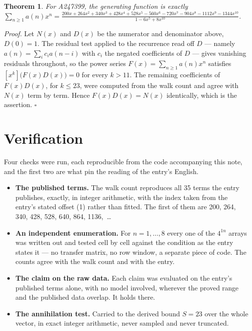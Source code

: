 \documentclass[11pt]{article}
\newtheorem{theorem}{Theorem}
\theoremstyle{definition}
\begin{document}
\begin{theorem} For A247399, the generating function is exactly $\sum_{n\ge 1} a(n)x^n = \frac{200x + 264x^{2} + 340x^{3} + 428x^{4} + 528x^{5} - 560x^{6} - 720x^{7} - 904x^{8} - 1112x^{9} - 1344x^{10}}{1 - 6x^{5} + 8x^{10}}$.\end{theorem}

{\itshape Proof.} Let $N(x)$ and $D(x)$ be the numerator and denominator above, $D(0)=1$. The residual test applied to the recurrence read off $D$ --- namely $a(n) = \sum_i c_i a(n-i)$ with $c_i$ the negated coefficients of $D$ --- gives vanishing residuals throughout, so the power series $F(x)=\sum_{n\ge 1}a(n)x^n$ satisfies $[x^k]\bigl(F(x)D(x)\bigr) = 0$ for every $k > 11$. The remaining coefficients of $F(x)D(x)$, for $k \le 23$, were computed from the walk count and agree with $N(x)$ term by term. Hence $F(x)D(x) = N(x)$ identically, which is the assertion. $\square$

\section{Verification}

Four checks were run, each reproducible from the code accompanying this note, and the first two are what pin the reading of the entry's English.

\begin{itemize}

\item {\bfseries The published terms.} The walk count reproduces all 35 terms the entry publishes, exactly, in integer arithmetic, with the index taken from the entry's stated offset (1) rather than fitted. The first of them are 200, 264, 340, 428, 528, 640, 864, 1136,~\dots

\item {\bfseries An independent enumeration.} For $n = 1,\dots,8$ every one of the $4^{1n}$ arrays was written out and tested cell by cell against the condition as the entry states it --- no transfer matrix, no row window, a separate piece of code. The counts agree with the walk count and with the entry.

\item {\bfseries The claim on the raw data.} Each claim was evaluated on the entry's published terms alone, with no model involved, wherever the proved range and the published data overlap. It holds there.

\item {\bfseries The annihilation test.} Carried to the derived bound $S = 23$ over the whole vector, in exact integer arithmetic, never sampled and never truncated.

\end{itemize}
\end{document}
